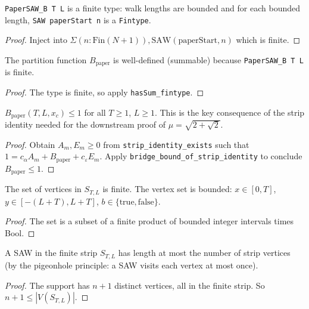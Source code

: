 \begin{lemma}\label{lem:paper_saw_b_finite}
\leanok
{}
  \texttt{PaperSAW\_B T L} is a finite type: walk lengths are bounded
  and for each bounded length, \texttt{SAW paperStart n} is a \texttt{Fintype}.
\end{lemma}
\begin{proof}
\leanok
  Inject into $\Sigma (n : \text{Fin}(N+1)), \text{SAW}(\text{paperStart}, n)$
  which is finite.
\end{proof}

\begin{lemma}\label{lem:B_paper_summable}
\leanok
{}
  The partition function $B_{\text{paper}}$ is well-defined (summable)
  because \texttt{PaperSAW\_B T L} is finite.
\end{lemma}
\begin{proof}
\leanok
  The type is finite, so apply \texttt{hasSum\_fintype}.
\end{proof}

\begin{theorem}\label{thm:B_paper_le_one}
\leanok
{}
  $B_{\text{paper}}(T,L,x_c) \le 1$ for all $T \ge 1$, $L \ge 1$.
  This is the key consequence of the strip identity needed for the
  downstream proof of $\mu = \sqrt{2+\sqrt{2}}$.
\end{theorem}
\begin{proof}
\leanok
  Obtain $A_m, E_m \ge 0$ from \texttt{strip\_identity\_exists} such that
  $1 = c_\alpha A_m + B_{\text{paper}} + c_\varepsilon E_m$.
  Apply \texttt{bridge\_bound\_of\_strip\_identity} to conclude
  $B_{\text{paper}} \le 1$.
\end{proof}

\begin{lemma}\label{lem:finite_strip_finite}
\leanok
{}
  The set of vertices in $S_{T,L}$ is finite.
  The vertex set is bounded: $x \in [0, T]$, $y \in [-(L+T), L+T]$,
  $b \in \{\mathrm{true}, \mathrm{false}\}$.
\end{lemma}
\begin{proof}
\leanok
  The set is a subset of a finite product of bounded integer intervals
  times Bool.
\end{proof}

\begin{lemma}\label{lem:strip_saw_length}
\leanok
{}
  A SAW in the finite strip $S_{T,L}$ has length at most the number of
  strip vertices (by the pigeonhole principle: a SAW visits each vertex
  at most once).
\end{lemma}
\begin{proof}
\leanok
  The support has $n+1$ distinct vertices, all in the finite strip.
  So $n + 1 \leq |V(S_{T,L})|$.
\end{proof}


